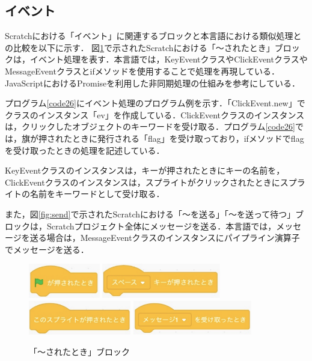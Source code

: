 \documentclass[10pt,a4j]{ltjsarticle}
\begin{document}
\subsection{イベント}
Scratchにおける「イベント」に関連するブロックと本言語における類似処理との比較を以下に示す．
図\ref{fig:then}で示されたScratchにおける「〜されたとき」ブロックは，イベント処理を表す．本言語では，KeyEventクラスやClickEventクラスやMessageEventクラスとifメソッドを使用することで処理を再現している．JavaScriptにおけるPromiseを利用した非同期処理の仕組みを参考にしている．

プログラム\ref{code26}にイベント処理のプログラム例を示す．「ClickEvent.new」でクラスのインスタンス「ev」を作成している．ClickEventクラスのインスタンスは，クリックしたオブジェクトのキーワードを受け取る．プログラム\ref{code26}では，旗が押されたときに発行される「flag」を受け取っており，ifメソッドでflagを受け取ったときの処理を記述している．

KeyEventクラスのインスタンスは，キーが押されたときにキーの名前を，ClickEventクラスのインスタンスは，スプライトがクリックされたときにスプライトの名前をキーワードとして受け取る．

また，図\ref{fig:send}で示されたScratchにおける「〜を送る」「〜を送って待つ」ブロックは，Scratchプロジェクト全体にメッセージを送る．本言語では，メッセージを送る場合は，MessageEventクラスのインスタンスにパイプライン演算子でメッセージを送る．

\begin{figure}[H]
  \centering
  \includegraphics[height=15mm]{images/flag.pdf} 
  \includegraphics[height=15mm]{images/keypress.pdf} \\
  \includegraphics[height=15mm]{images/click.pdf} 
  \includegraphics[height=15mm]{images/message.pdf}
  \caption{「〜されたとき」ブロック}
  \label{fig:then}
\end{figure}
\end{document}
